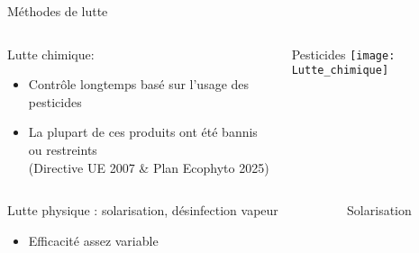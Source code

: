 \begin{frame}[fragile]{Méthodes de lutte}

\vspace{-0.1cm}

\begin{columns}
 \begin{column}{.8\textwidth}
 \hspace{5mm} {\normalsize Lutte chimique:} 
  {\small          \begin{itemize}[leftmargin=1.22cm]
\item Contrôle longtemps basé sur l'usage  des pesticides 
\item La plupart de ces produits ont été bannis ou restreints \\(Directive UE 2007 \& Plan Ecophyto 2025)

            \end{itemize}}
 \end{column}

 \begin{column}{.31\textwidth}
 \hspace{6.5mm} {\small Pesticides}
\texttt{[image: Lutte\_chimique]}    
 \end{column}
\end{columns}
\pause

\begin{columns}
 \begin{column}{.8\textwidth}
\hspace{5mm}
{\normalsize Lutte physique : solarisation, désinfection vapeur  }
   { \small        \begin{itemize}[leftmargin=1.22cm]
\item Efficacité assez variable

            \end{itemize}}
 \end{column}

 \begin{column}{.3\textwidth}
\hspace{6mm} {\small Solarisation}


\end{column}
\end{columns}
\end{frame}
